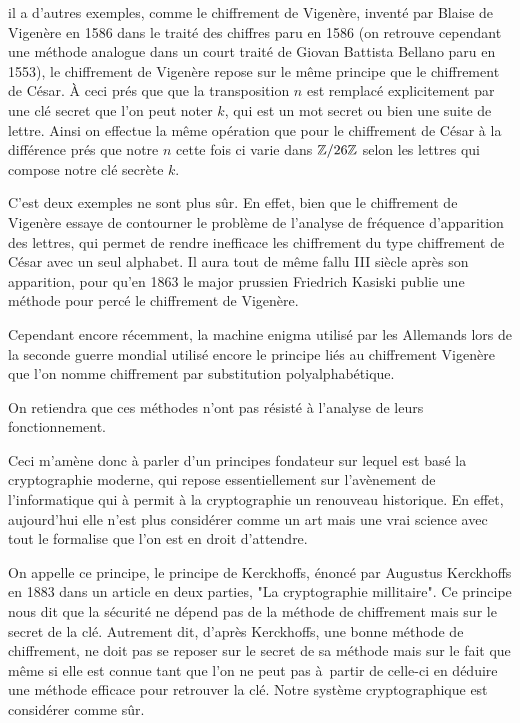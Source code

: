 il a d'autres exemples, comme le chiffrement de Vigenère, inventé par Blaise de Vigenère en
1586 dans le traité des chiffres paru en 1586 (on retrouve cependant une méthode analogue
dans un court traité de Giovan Battista Bellano paru en 1553), le chiffrement de Vigenère repose sur le même principe que
le chiffrement de César. À ceci prés que que la transposition $n$ est remplacé explicitement
par une clé secret que l'on peut noter $k$, qui est un mot secret ou bien une suite de lettre.
Ainsi on effectue la même opération que pour le chiffrement de César à la différence prés que
notre $n$ cette fois ci varie dans $\mathbb{Z} / 26\mathbb{Z}$ selon les lettres qui compose notre clé secrète $k$.

C'est deux exemples ne sont plus sûr. En effet, bien que le chiffrement de Vigenère essaye de
contourner le problème de l'analyse de fréquence d'apparition des lettres, qui permet de rendre
inefficace les chiffrement du type chiffrement de César avec un seul alphabet. Il aura tout de
même fallu III
siècle après son apparition, pour qu'en 1863 le major prussien Friedrich Kasiski publie une
méthode pour percé le chiffrement de Vigenère.

Cependant encore récemment, la machine enigma utilisé par les Allemands lors de la seconde
guerre mondial utilisé encore le principe liés au chiffrement Vigenère que l'on nomme chiffrement
par substitution polyalphabétique.

On retiendra que ces méthodes n'ont pas résisté à l'analyse de leurs
fonctionnement.

Ceci m'amène donc à parler d'un principes fondateur sur lequel est basé la cryptographie
moderne, qui repose essentiellement sur l'avènement de l'informatique qui à permit à la
cryptographie un renouveau historique. En effet, aujourd'hui elle n'est plus considérer comme
un art mais une vrai science avec tout le formalise que l'on est en droit d'attendre.

On appelle ce principe, le principe de Kerckhoffs, énoncé par Augustus Kerckhoffs en 1883 dans
un article en deux parties, "La cryptographie millitaire". Ce principe nous dit que la sécurité
ne dépend pas de la méthode de chiffrement mais sur le secret de la clé. Autrement dit, d'après
Kerckhoffs, une bonne méthode de chiffrement, ne doit pas se reposer sur le secret de sa
méthode mais sur le fait que même si elle est connue tant que l'on ne peut pas à partir de
celle-ci en déduire une méthode efficace pour retrouver la clé. Notre système
cryptographique est considérer comme sûr. 

